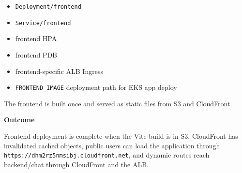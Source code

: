 \begin{itemize}
\tightlist
\item
  \texttt{Deployment/\allowbreak{}frontend}
\item
  \texttt{Service/\allowbreak{}frontend}
\item
  frontend HPA
\item
  frontend PDB
\item
  frontend-specific ALB Ingress
\item
  \texttt{FRONTEND\_\allowbreak{}IMAGE} deployment path for EKS app deploy
\end{itemize}

The frontend is built once and served as static files from S3 and
CloudFront.

\vspace{0.5em}\noindent\textbf{Outcome}\par

Frontend deployment is complete when the Vite build is in S3, CloudFront
has invalidated cached objects, public users can load the application
through \texttt{https:/\allowbreak{}/\allowbreak{}dhm2rz5nmsibj.\allowbreak{}cloudfront.\allowbreak{}net}, and dynamic
routes reach backend/chat through CloudFront and the ALB.

